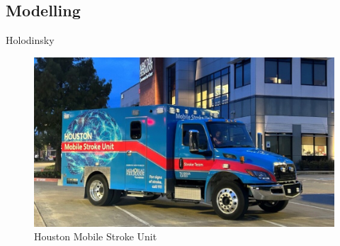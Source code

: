 \subsection{Modelling}

Holodinsky \cite{holodinsky_jessalyn_k_what_2020}




\begin{figure}
    \centering
    \includegraphics[width=0.5\linewidth]{images_background/houston_msu.jpeg}
    \caption{Houston Mobile Stroke Unit}
    \label{fig:houston_msu}
\end{figure}


